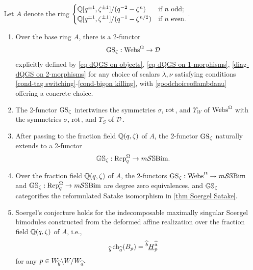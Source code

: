 \begin{theorem}\label{thm main}
Let $A$ denote the ring $\begin{cases}
\mathbb{Q}[q^{\pm 1}, \zeta^{\pm 1}]/(q^{-2}-\zeta^n) &\text{if $n$ odd;}\\
\mathbb{Q}[q^{\pm 1}, \zeta^{\pm 1}]/(q^{-1}-\zeta^{n/2}) &\text{if $n$ even.}
    \end{cases}$.
\begin{enumerate}
   \item Over the base ring $A$, there is a 2-functor 
   $$\operatorname{GS}_\zeta: \operatorname{Webs}^{\Omega} \rightarrow \mathcal{D}$$ explicitly defined by \cref{eq dQGS on objects}, \cref{eq dQGS on 1-morphisms}, \cref{diag-dQGS on 2-morphisms} for any choice of scalars $\lambda, \nu$ satisfying conditions \cref{cond-tag switching}-\cref{cond-bigon killing},  with \cref{goodchoiceoflambdanu} offering a concrete choice.
    
  \item   The 2-functor $\operatorname{GS}_\zeta$ intertwines the symmetries $\sigma$, $\operatorname{rot}$, and $\Upsilon_W$ of $\operatorname{Webs}^{\Omega}$ with the symmetries $\sigma$, $\operatorname{rot}$, and $\Upsilon_S$ of $\mathcal{D}$.
    
  \item  After passing to the fraction field $\mathbb{Q}(q,\zeta)$ of $A$, the 2-functor $\operatorname{GS}_\zeta$ naturally extends to a 2-functor $$\mathbb{GS}_\zeta: \operatorname{Rep}_q^{\Omega} \rightarrow m\mathcal{S}\mathbb{S}\text{Bim}.$$
  \item Over the fraction field $\mathbb{Q}(q,\zeta)$ of $A$, the 2-functors 
    $\operatorname{GS}_\zeta: \operatorname{Webs}^{\Omega} \rightarrow m\mathcal{S}\mathbb{S}\text{Bim}$ and $\mathbb{GS}_\zeta: \operatorname{Rep}_q^{\Omega} \rightarrow m\mathcal{S}\mathbb{S}\text{Bim}$ are degree zero equivalences, and $\mathbb{GS}_\zeta$ categorifies the reformulated Satake isomorphism in \cref{thm Soergel Satake}.
  \item Soergel's conjecture holds for the indecomposable maximally singular Soergel bimodules constructed from the deformed affine realization over the fraction field $\mathbb{Q}(q,\zeta)$ of $A$, i.e.,
  $${}_{\widehat{b}}\operatorname{ch}_{\widehat{a}}(B_{p})={}^{\widehat{b}}\underline{H}^{\widehat{a}}_{p}$$
  for any $p \in W_{\widehat{b}} \backslash W/ W_{\widehat{a}}.$
  
    \end{enumerate}
\end{theorem}

